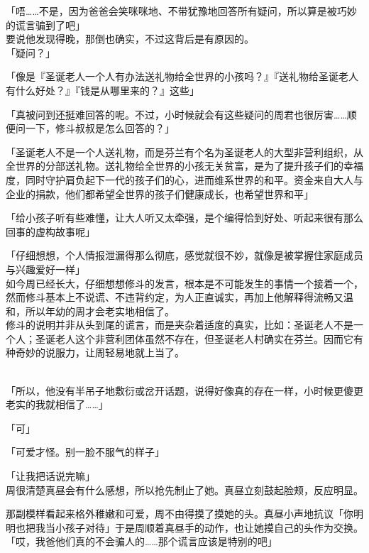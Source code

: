 「唔……不是，因为爸爸会笑咪咪地、不带犹豫地回答所有疑问，所以算是被巧妙的谎言骗到了吧」\\

要说他发现得晚，那倒也确实，不过这背后是有原因的。\\

「疑问？」

「像是『圣诞老人一个人有办法送礼物给全世界的小孩吗？』『送礼物给圣诞老人有什么好处？』『钱是从哪里来的？』这些」

「真被问到还挺难回答的呢。不过，小时候就会有这些疑问的周君也很厉害……顺便问一下，修斗叔叔是怎么回答的？」

「圣诞老人不是一个人送礼物，而是芬兰有个名为圣诞老人的大型非营利组织，从全世界的分部送礼物。送礼物给全世界的小孩无关贫富，是为了提升孩子们的幸福度，同时守护肩负起下一代的孩子们的心，进而维系世界的和平。资金来自大人与企业的捐款，他们都希望全世界的孩子们健康成长，也希望世界和平」

「给小孩子听有些难懂，让大人听又太牵强，是个编得恰到好处、听起来很有那么回事的虚构故事呢」

「仔细想想，个人情报泄漏得那么彻底，感觉就很不妙，就像是被掌握住家庭成员与兴趣爱好一样」\\

如今周已经长大，仔细想想修斗的发言，根本是不可能发生的事情一个接着一个，然而修斗基本上不说谎、不违背约定，为人正直诚实，再加上他解释得流畅又温和，所以年幼的周才会老实地相信了。\\

修斗的说明并非从头到尾的谎言，而是夹杂着适度的真实，比如：圣诞老人不是一个人；圣诞老人这个非营利团体虽然不存在，但圣诞老人村确实在芬兰。因而它有种奇妙的说服力，让周轻易地就上当了。\\\

「所以，他没有半吊子地敷衍或岔开话题，说得好像真的存在一样，小时候更傻更老实的我就相信了……」

「可」

「可爱才怪。别一脸不服气的样子」

「让我把话说完嘛」\\

周很清楚真昼会有什么感想，所以抢先制止了她。真昼立刻鼓起脸颊，反应明显。

那副模样看起来格外稚嫩和可爱，周不由得摸了摸她的头。真昼小声地抗议「你明明也把我当小孩子对待」于是周顺着真昼手的动作，也让她摸自己的头作为交换。\\

「哎，我爸他们真的不会骗人的……那个谎言应该是特别的吧」

